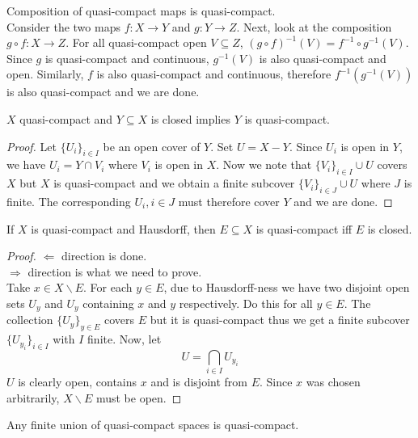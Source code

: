 \documentclass[oneside, 12pt]{scrbook}
\theoremstyle{theorem}
\begin{document}
\begin{exercise}
Composition of quasi-compact maps is quasi-compact.\\

Consider the two maps $f: X \rightarrow Y$ and $g: Y \rightarrow Z$. Next, look at the composition $g \circ f : X \rightarrow Z$. For all quasi-compact open $V \subseteq Z$, $(g \circ f)^{-1} (V) = f^{-1} \circ g^{-1} (V)$. Since $g$ is quasi-compact and continuous, $g^{-1}(V)$ is also quasi-compact and open. Similarly, $f$ is also quasi-compact and continuous, therefore $f^{-1}(g^{-1}(V))$ is also quasi-compact and we are done.
\end{exercise} 

\begin{lemma}
$X$ quasi-compact and $Y \subseteq X$ is closed implies $Y$ is quasi-compact.
\end{lemma}

\begin{proof}
Let $\{U_{i}\}_{i \in I}$ be an open cover of $Y$. Set $U = X - Y$. Since $U_{i}$ is open in $Y$, we have $U_{i} = Y \cap V_{i}$ where $V_{i}$ is open in $X$. Now we note that $\{V_{i}\}_{i \in I} \cup U$ covers $X$ but $X$ is quasi-compact and we obtain a finite subcover $\{V_{i}\}_{i \in J} \cup U$ where $J$ is finite. The corresponding $U_{i}, i \in J$ must therefore cover $Y$ and we are done.
\end{proof}

\begin{proposition}
If $X$ is quasi-compact and Hausdorff, then $E \subseteq X$ is quasi-compact iff $E$ is closed.
\end{proposition}

\begin{proof}
$\Leftarrow$ direction is done. \\
$\Rightarrow$ direction is what we need to prove. \\
Take $x\in X \backslash E$. For each $y \in E$, due to Hausdorff-ness we have two disjoint open sets $U_{y}$ and $U_{y}$ containing $x$ and $y$ respectively. Do this for all $y \in E$. The collection $\{U_{y}\}_{y \in E}$ covers $E$ but it is quasi-compact thus we get a finite subcover $\{U_{y_{i}}\}_{i \in I}$ with $I$ finite. Now, let $$U = \bigcap_{i \in I} U_{y_{i}}$$ $U$ is clearly open, contains $x$ and is disjoint from $E$. Since $x$ was chosen arbitrarily, $X\backslash E$ must be open. 
\end{proof}

\begin{lemma}
Any finite union of quasi-compact spaces is quasi-compact.
\end{lemma}
\end{document}
